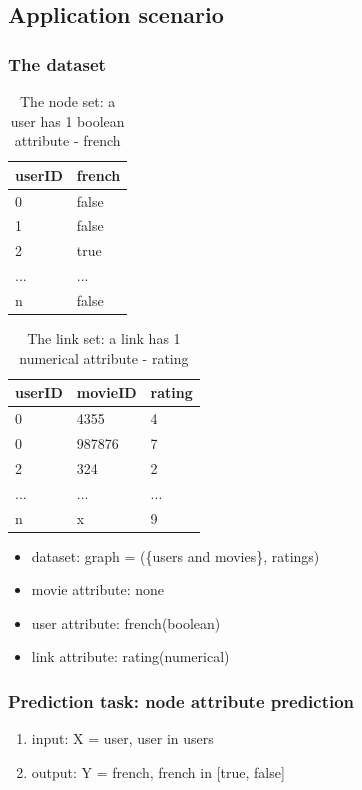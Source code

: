 \documentclass{article}
\begin{document}
\subsection{Application scenario}

\subsubsection{The dataset}
\begin{table}[H]
	\centering
	\begin{tabularx}{0.5\textwidth}{|X|X| }  \hline
		userID & french \\ \hline
		0 & false \\ \hline
		1 & false \\ \hline
		2 & true \\ \hline
		... & ... \\ \hline
		n & false \\ \hline
	\end{tabularx}
	\caption{The node set: a user has 1 boolean attribute - french}
	\label{tab:user}
\end{table}
\begin{table}[H]
	\centering
	\begin{tabularx}{0.5\textwidth}{|X|X|X| }  \hline
		userID & movieID & rating \\ \hline
		0 & 4355 & 4 \\ \hline
		0 & 987876 & 7 \\ \hline
		2 & 324 & 2 \\ \hline
		... & ... & ... \\ \hline
		n & x & 9 \\ \hline
	\end{tabularx}
	\caption{The link set: a link has 1 numerical attribute - rating}
	\label{tab:rating}
\end{table}
\begin{itemize}
	\item dataset: graph = (\{users and movies\}, ratings)
	\item movie attribute: none
	\item user attribute: french(boolean)
	\item link attribute: rating(numerical)
\end{itemize}

\subsubsection{Prediction task: node attribute prediction}
\begin{enumerate}
	\item input: X = user, user in users
	\item output: Y = french, french in [true, false]
\end{enumerate}
\end{document}
